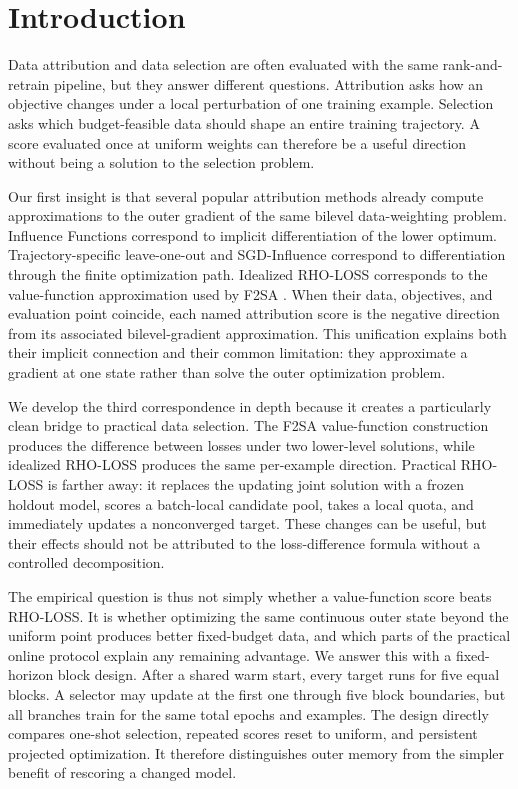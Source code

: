 \section{Introduction}

Data attribution and data selection are often evaluated with the same
rank-and-retrain pipeline, but they answer different questions. Attribution
asks how an objective changes under a local perturbation of one training
example. Selection asks which budget-feasible data should shape an entire
training trajectory. A score evaluated once at uniform weights can therefore
be a useful direction without being a solution to the selection problem.

Our first insight is that several popular attribution methods already compute
approximations to the outer gradient of the same bilevel data-weighting
problem. Influence Functions \citep{koh2017influence} correspond to implicit
differentiation of the lower optimum. Trajectory-specific leave-one-out and
SGD-Influence \citep{hara2019sgdinfluence} correspond to differentiation
through the finite optimization path. Idealized RHO-LOSS
\citep{mindermann2022rholoss} corresponds to the value-function approximation
used by F2SA \citep{kwon2023f2sa}. When their data, objectives, and evaluation
point coincide, each named attribution score is the negative direction from
its associated bilevel-gradient approximation. This unification explains both
their implicit connection and their common limitation: they approximate a
gradient at one state rather than solve the outer optimization problem.

We develop the third correspondence in depth because it creates a particularly
clean bridge to practical data selection. The F2SA value-function construction
produces the difference between losses under two lower-level solutions, while
idealized RHO-LOSS produces the same per-example direction. Practical RHO-LOSS
is farther away: it replaces the updating joint solution with a frozen holdout
model, scores a batch-local candidate pool, takes a local quota, and immediately
updates a nonconverged target. These changes can be useful, but their effects
should not be attributed to the loss-difference formula without a controlled
decomposition.

The empirical question is thus not simply whether a value-function score beats
RHO-LOSS. It is whether optimizing the same continuous outer state beyond the
uniform point produces better fixed-budget data, and which parts of the
practical online protocol explain any remaining advantage. We answer this with
a fixed-horizon block design. After a shared warm start, every target runs for
five equal blocks. A selector may update at the first one through five block
boundaries, but all branches train for the same total epochs and examples. The
design directly compares one-shot selection, repeated scores reset to uniform,
and persistent projected optimization. It therefore distinguishes outer
memory from the simpler benefit of rescoring a changed model.

